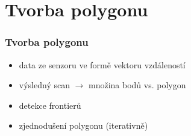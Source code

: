 \documentclass[notes=false,pdftex]{beamer}
\begin{document}
\section{Tvorba polygonu}
{
\begin{frame}%
	\frametitle{Tvorba polygonu}

	\begin{itemize}
		\item data ze senzoru ve formě vektoru vzdáleností
		\item výsledný scan $\longrightarrow$ množina bodů vs. polygon
		\item detekce frontierů
		\item zjednodušení polygonu (iterativně)
	\end{itemize}

\end{frame}
}

\end{document}
